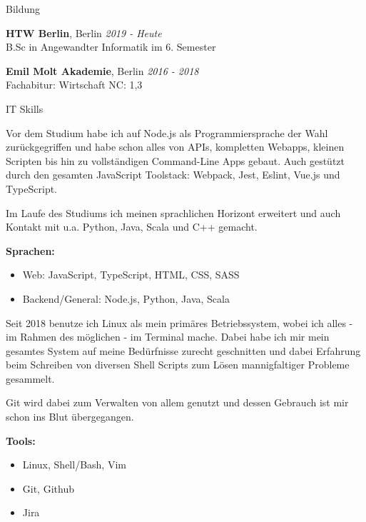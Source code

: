 \documentclass{cv}
\begin{document}
\begin{rSection}{Bildung}

{\bf HTW Berlin}, Berlin \hfill {\em 2019 - Heute}\\
B.Sc in Angewandter Informatik
\hfill im 6. Semester

\smallskip

{\bf Emil Molt Akademie}, Berlin \hfill {\em 2016 - 2018}\\
Fachabitur: Wirtschaft
\hfill NC: 1,3

\end{rSection}

\begin{rSection}{IT Skills}

  \newcommand\skillWidth{0.48}
  \begin{minipage}[t]{\skillWidth\linewidth}

Vor dem Studium habe ich auf Node.js als Programmiersprache der Wahl
zurückgegriffen und habe schon alles von APIs, kompletten Webapps, kleinen
Scripten bis hin zu vollständigen Command-Line Apps gebaut. Auch gestützt durch
den gesamten JavaScript Toolstack: Webpack, Jest, Eslint, Vue.js und TypeScript.

    \medskip

Im Laufe des Studiums ich meinen sprachlichen Horizont erweitert und auch
Kontakt mit u.a. Python, Java, Scala und C++ gemacht.

    \medskip

    \textbf{Sprachen:}
    \begin{itemize}
      \item Web: JavaScript, TypeScript, HTML, CSS, SASS
      \item Backend/General: Node.js, Python, Java, Scala
    \end{itemize}
  \end{minipage}
  \hfill
  \begin{minipage}[t]{\skillWidth\linewidth}

Seit 2018 benutze ich Linux als mein primäres Betriebssystem, wobei ich
alles - im Rahmen des möglichen - im Terminal mache. Dabei habe ich mir mein
gesamtes System auf meine Bedürfnisse zurecht geschnitten und dabei Erfahrung
beim Schreiben von diversen Shell Scripts zum Lösen mannigfaltiger Probleme
gesammelt.

Git wird dabei zum Verwalten von allem genutzt und dessen Gebrauch
ist mir schon ins Blut übergegangen.

    \medskip

    \textbf{Tools:}
    \begin{itemize}
      \item Linux, Shell/Bash, Vim
      \item Git, Github
      \item Jira
    \end{itemize}


\end{minipage}
\end{rSection}
\end{document}
